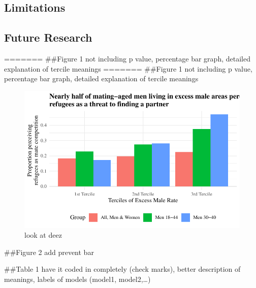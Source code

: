 \documentclass[
]{article}
\begin{document}
\hypertarget{limitations}{%
\subsection{Limitations}\label{limitations}}

\hypertarget{future-research}{%
\subsection{Future Research}\label{future-research}}

======= \#\#Figure 1 not including p value, percentage bar graph,
detailed explanation of tercile meanings ======= \#\#Figure 1 not
including p value, percentage bar graph, detailed explanation of tercile
meanings

\begin{figure}

{\centering \includegraphics{paper_files/figure-pdf/fig-excess-1.pdf}

}

\caption{\label{fig-excess}look at deez}

\end{figure}

\#\#Figure 2 add prevent bar

\#\#Table 1 have it coded in completely (check marks), better
description of meanings, labels of models (model1, model2,\ldots)
\end{document}
